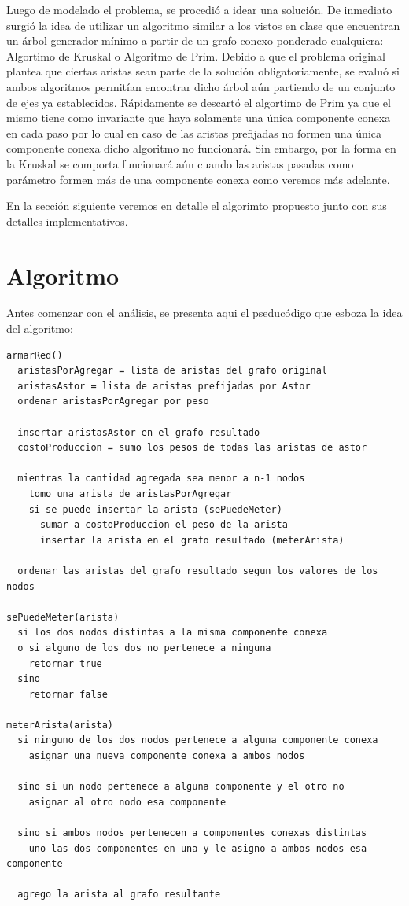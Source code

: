 \documentclass[a4paper,11pt] {article}
\begin{document}
Luego de modelado el problema, se procedió a idear una solución. De inmediato surgió la idea de utilizar un algoritmo similar a los vistos en clase que encuentran un árbol generador mínimo a partir de un grafo conexo ponderado cualquiera: Algortimo de Kruskal o Algoritmo de Prim. Debido a que el problema original plantea que ciertas aristas sean parte de la solución obligatoriamente, se evaluó si ambos algoritmos permitían encontrar dicho árbol aún partiendo de un conjunto de ejes ya establecidos. Rápidamente se descartó el algortimo de Prim ya que el mismo tiene como invariante que haya solamente una única componente conexa en cada paso por lo cual en caso de las aristas prefijadas no formen una única componente conexa dicho algoritmo no funcionará. Sin embargo, por la forma en la Kruskal se comporta funcionará aún cuando las aristas pasadas como parámetro formen más de una componente conexa como veremos más adelante.

En la sección siguiente veremos en detalle el algorimto propuesto junto con sus detalles implementativos.

\section*{Algoritmo}

Antes comenzar con el análisis, se presenta aqui el pseducódigo que esboza la idea del algoritmo:

\begin{verbatim}
armarRed()
  aristasPorAgregar = lista de aristas del grafo original
  aristasAstor = lista de aristas prefijadas por Astor
  ordenar aristasPorAgregar por peso

  insertar aristasAstor en el grafo resultado
  costoProduccion = sumo los pesos de todas las aristas de astor

  mientras la cantidad agregada sea menor a n-1 nodos
    tomo una arista de aristasPorAgregar
    si se puede insertar la arista (sePuedeMeter)
      sumar a costoProduccion el peso de la arista
      insertar la arista en el grafo resultado (meterArista)

  ordenar las aristas del grafo resultado segun los valores de los nodos

sePuedeMeter(arista)
  si los dos nodos distintas a la misma componente conexa 
  o si alguno de los dos no pertenece a ninguna
    retornar true
  sino
    retornar false

meterArista(arista)
  si ninguno de los dos nodos pertenece a alguna componente conexa
    asignar una nueva componente conexa a ambos nodos

  sino si un nodo pertenece a alguna componente y el otro no
    asignar al otro nodo esa componente

  sino si ambos nodos pertenecen a componentes conexas distintas
    uno las dos componentes en una y le asigno a ambos nodos esa componente

  agrego la arista al grafo resultante
\end{verbatim}
\end{document}
